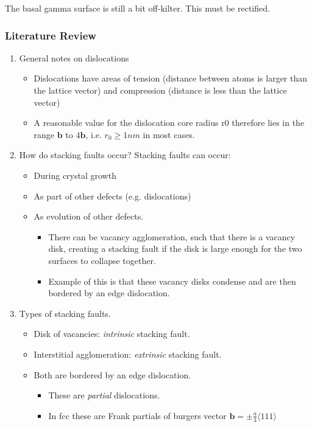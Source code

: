 \documentclass[11pt]{article}
\begin{document}
The basal gamma surface is still a bit off-kilter. This must be
rectified. 


\subsubsection{Literature Review}
\label{sec:orgc3a0bc9}

\begin{enumerate}
\item General notes on dislocations
\label{sec:org7da0615}
\begin{itemize}
\item Dislocations have areas of tension (distance between atoms is larger
than the lattice vector) and compression (distance is less than the
lattice vector)
\item A reasonable value for the dislocation core radius r0 therefore lies in the range \(\mathbf{b}\) to \(4\mathbf{b}\), i.e. \(r_0 \geq 1 nm\) in most cases.
\end{itemize}

\item How do stacking faults occur?
\label{sec:orgbedc8d6}
Stacking faults can occur:
\begin{itemize}
\item During crystal growth
\item As part of other defects (e.g. dislocations)
\item As evolution of other defects.
\begin{itemize}
\item There can be vacancy agglomeration, such that there is a vacancy
disk, creating a stacking fault if the disk is large enough for the
two surfaces to collapse together.
\item Example of this is that these vacancy disks condense and are then
bordered by an edge dislocation.
\end{itemize}
\end{itemize}

\item Types of stacking faults.
\label{sec:orgedde922}
\begin{itemize}
\item Disk of vacancies: \emph{intrinsic} stacking fault.
\item Interstitial agglomeration: \emph{extrinsic} stacking fault.
\item Both are bordered by an edge dislocation.
\begin{itemize}
\item These are \emph{partial} dislocations.
\item In fcc these are Frank partials of burgers vector \(\mathbf{b} =
         \pm \frac{a}{3}\langle 111\rangle\)
\end{itemize}
\end{itemize}


\end{enumerate}
\end{document}
